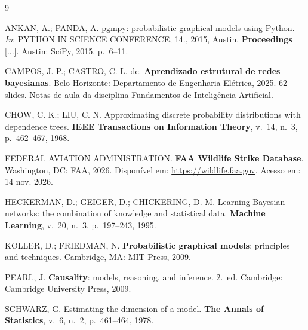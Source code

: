 \documentclass[10pt,a4paper,twocolumn]{article}
\begin{document}
\begin{thebibliography}{9}
\setlength{\itemsep}{1pt}
\small

ANKAN, A.; PANDA, A. pgmpy: probabilistic graphical models using Python. \emph{In}: PYTHON IN SCIENCE CONFERENCE, 14.,
2015, Austin. \textbf{Proceedings} [...]. Austin: SciPy, 2015. p.~6--11.

CAMPOS, J. P.; CASTRO, C. L. de. \textbf{Aprendizado estrutural de redes bayesianas}. Belo Horizonte: Departamento
de Engenharia Elétrica, 2025. 62 slides. Notas de aula da disciplina Fundamentos de Inteligência Artificial.

CHOW, C. K.; LIU, C. N. Approximating discrete probability distributions with dependence trees. \textbf{IEEE
Transactions on Information Theory}, v.~14, n.~3, p.~462--467, 1968.

FEDERAL AVIATION ADMINISTRATION. \textbf{FAA Wildlife Strike Database}. Washington, DC: FAA, 2026. Disponível em:
\url{https://wildlife.faa.gov}. Acesso em: 14 nov. 2026.

HECKERMAN, D.; GEIGER, D.; CHICKERING, D. M. Learning Bayesian networks: the combination of knowledge and statistical
data. \textbf{Machine Learning}, v.~20, n.~3, p.~197--243, 1995.

KOLLER, D.; FRIEDMAN, N. \textbf{Probabilistic graphical models}: principles and techniques. Cambridge, MA: MIT
Press, 2009.

PEARL, J. \textbf{Causality}: models, reasoning, and inference. 2.~ed. Cambridge: Cambridge University Press, 2009.

SCHWARZ, G. Estimating the dimension of a model. \textbf{The Annals of Statistics}, v.~6, n.~2, p.~461--464, 1978.

\end{thebibliography}
\end{document}
